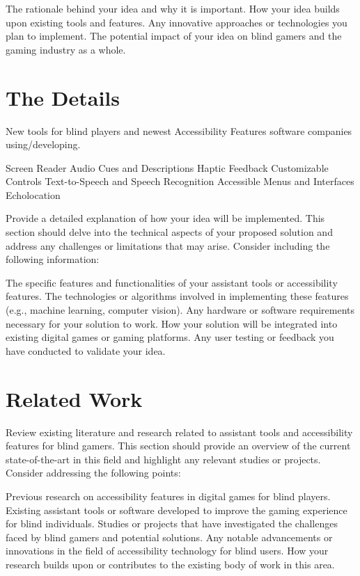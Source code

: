 \documentclass[sigconf,natbib=false,9pt]{acmart}
\begin{document}
	The rationale behind your idea and why it is important.
	How your idea builds upon existing tools and features.
	Any innovative approaches or technologies you plan to implement.
	The potential impact of your idea on blind gamers and the gaming industry as a whole.
	
	\section{The Details}
	New tools for blind players and newest Accessibility Features software companies using/developing.
	
	Screen Reader
	Audio Cues and Descriptions
	Haptic Feedback
	Customizable Controls
	Text-to-Speech and Speech Recognition
	Accessible Menus and Interfaces
	Echolocation
	
	Provide a detailed explanation of how your idea will be implemented. This section should delve into the technical aspects of your proposed solution and address any challenges or limitations that may arise. Consider including the following information:
	
	The specific features and functionalities of your assistant tools or accessibility features.
	The technologies or algorithms involved in implementing these features (e.g., machine learning, computer vision).
	Any hardware or software requirements necessary for your solution to work.
	How your solution will be integrated into existing digital games or gaming platforms.
	Any user testing or feedback you have conducted to validate your idea.
	
	\section{Related Work}
	Review existing literature and research related to assistant tools and accessibility features for blind gamers. This section should provide an overview of the current state-of-the-art in this field and highlight any relevant studies or projects. Consider addressing the following points:
	
	Previous research on accessibility features in digital games for blind players.
	Existing assistant tools or software developed to improve the gaming experience for blind individuals.
	Studies or projects that have investigated the challenges faced by blind gamers and potential solutions.
	Any notable advancements or innovations in the field of accessibility technology for blind users.
	How your research builds upon or contributes to the existing body of work in this area.
	
\end{document}
